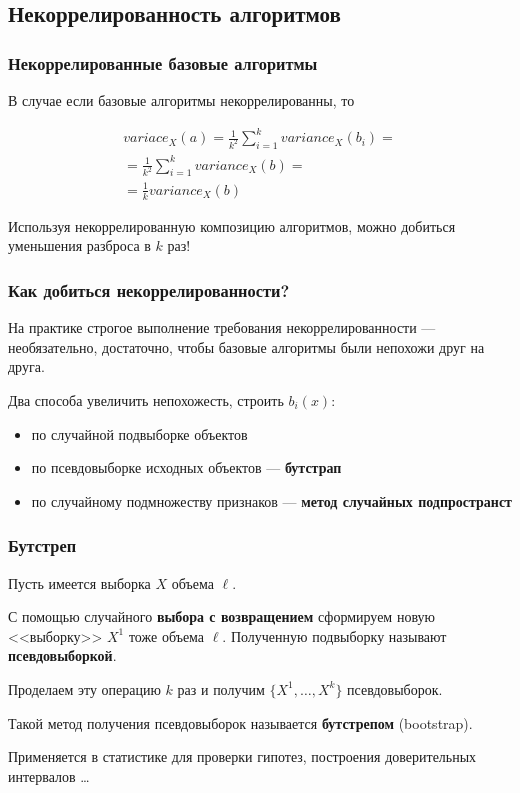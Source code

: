 \documentclass{beamer}
\begin{document}
	\subsection{Некоррелированность алгоритмов}

	\begin{frame}
		\frametitle{Некоррелированные базовые алгоритмы}

		В случае если базовые алгоритмы некоррелированны, то

		\begin{align*}
			variace_X(a) = \frac{1}{k^2} \sum_{i=1}^{k} variance_X(b_i) = \\ 
			= \frac{1}{k^2} \sum_{i=1}^{k} variance_X(b) = \\
			= \frac{1}{k} variance_X(b)
		\end{align*}

		Используя некоррелированную композицию алгоритмов, можно добиться уменьшения разброса 
		в $k$ раз!
	\end{frame}

	\begin{frame}
		\frametitle{Как добиться некоррелированности?}

		На практике строгое выполнение требования некоррелированности --- необязательно,
		достаточно, чтобы базовые алгоритмы были непохожи друг на друга.

		\vspace{15pt}

		Два способа увеличить непохожесть, строить $b_i(x)$:
		\begin{itemize}
			\item по случайной подвыборке объектов
			\item по псевдовыборке исходных объектов --- \textbf{бутстрап}
			\item по случайному подмножеству признаков --- \textbf{метод случайных подпространст}
		\end{itemize}
	\end{frame}

	\begin{frame}
		\frametitle{Бутстреп}

		Пусть имеется выборка $X$ объема $\ell$.

		\vspace{15pt}

		С помощью случайного \textbf{выбора с возвращением} сформируем новую <<выборку>> $X^1$ тоже объема $\ell$. 
		Полученную подвыборку называют \textbf{псевдовыборкой}.

		Проделаем эту операцию $k$ раз и получим $\{X^1, \dots, X^k\}$ псевдовыборок.

		\vspace{15pt}

		Такой метод получения псевдовыборок называется \textbf{бутстрепом} (bootstrap).

		\vspace{15pt}

		Применяется в статистике для проверки гипотез, построения доверительных интервалов \dots
	\end{frame}
\end{document}

